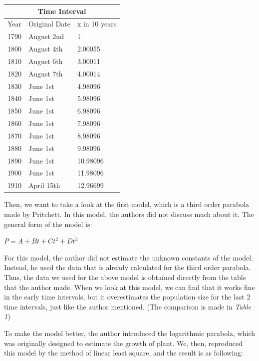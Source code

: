 \documentclass[a4paper]{article}
\begin{document}
\begin{center}
\begin{tabular}{ |p{1.5cm}||p{2.5cm}|p{2.5cm}| }
 \hline
 \multicolumn{3}{|c|}{Time Interval} \\
 \hline
 Year & Original Date & x in 10 years\\
 \hline
 1790 & August 2nd & 1\\
 1800 & August 4th &  2.00055 \\
 1810 & August 6th & 3.00011\\
 1820 & August 7th & 4.00014\\
 1830 & June 1st & 4.98096\\
 1840 & June 1st & 5.98096 \\
 1850 & June 1st &  6.98096\\
 1860 & June 1st & 7.98096\\
 1870 & June 1st &  8.98096\\
 1880 & June 1st &  9.98096\\
 1890 & June 1st &  10.98096 \\
 1900 & June 1st &  11.98096\\
 1910 & April 15th & 12.96699\\
 \hline
\end{tabular}
\end{center}

Then, we want to take a look at the first model, which is a third order parabola made by Pritchett. In this model, the authors did not discuss much about it. The general form of the model is: \

\begin{center}

$P = A+Bt+Ct^2+Dt^3$\

\end{center}

For this model, the author did not estimate the unknown constants of the model. Instead, he used the data that is already calculated for the third order parabola. Thus, the data we used for the above model is obtained directly from the table that the author made. When we look at this model, we can find that it works fine in the early time intervals, but it overestimates the population size for the last 2 time intervals, just like the author mentioned. (The comparison is made in \textit{Table 1}) \

To make the model better, the author introduced the logarithmic parabola, which was originally designed to estimate the growth of plant. We, then, reproduced this model by the method of linear least square, and the result is as following: \
\end{document}
